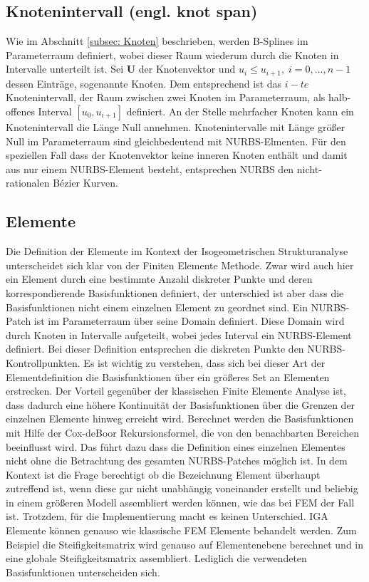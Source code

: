\documentclass[german,a4paper,12pt,oneside]{scrbook}
\theoremstyle{definition}
\theoremstyle{definition}
\theoremstyle{definition}
\theoremstyle{definition}
\theoremstyle{definition}
\theoremstyle{definition}
\begin{document}
\subsection{Knotenintervall (engl. knot span)}
\label{subsec: Knotenintervall}
Wie im Abschnitt \ref{subsec: Knoten} beschrieben, werden B-Splines im Parameterraum definiert, wobei dieser Raum wiederum durch die Knoten in Intervalle unterteilt ist. Sei $\bm{U}$ der Knotenvektor und $u_i \leq u_{i+1}, \; i = 0,...,n-1$  dessen Einträge, sogenannte Knoten. Dem entsprechend ist das $i-te$ Knotenintervall, der Raum zwischen zwei Knoten im Parameterraum, als halb-offenes Interval $[u_0, u_{i+1}]$ definiert. An der Stelle mehrfacher Knoten kann ein Knotenintervall die Länge Null annehmen. Knotenintervalle mit Länge größer Null im Parameterraum sind gleichbedeutend mit NURBS-Elmenten. Für den speziellen Fall dass der Knotenvektor keine inneren Knoten enthält und damit aus nur einem NURBS-Element besteht, entsprechen NURBS den nicht-rationalen Bézier Kurven. 

\subsection{Elemente}
Die Definition der Elemente im Kontext der Isogeometrischen Strukturanalyse unterscheidet sich klar von der Finiten Elemente Methode. Zwar wird auch hier ein Element durch eine bestimmte Anzahl diskreter Punkte und deren korrespondierende Basisfunktionen definiert, der unterschied ist aber dass die Basisfunktionen nicht einem einzelnen Element zu geordnet sind. Ein NURBS-Patch ist im Parameterraum über seine Domain definiert. Diese Domain wird durch Knoten in Intervalle aufgeteilt, wobei jedes Interval ein NURBS-Element definiert. Bei dieser Definition entsprechen die diskreten Punkte den NURBS-Kontrollpunkten. Es ist wichtig zu verstehen, dass sich bei dieser Art der Elementdefinition die Basisfunktionen über ein größeres Set an Elementen erstrecken. Der Vorteil gegenüber der klassischen Finite Elemente Analyse ist, dass dadurch eine höhere Kontinuität der Basisfunktionen über die Grenzen der einzelnen Elemente hinweg erreicht wird. 
Berechnet werden die Basisfunktionen mit Hilfe der Cox-deBoor Rekursionsformel, die von den benachbarten Bereichen beeinflusst wird. Das führt dazu dass die Definition eines einzelnen Elementes nicht ohne die Betrachtung des gesamten NURBS-Patches möglich ist. In dem Kontext ist die Frage berechtigt ob die Bezeichnung Element überhaupt zutreffend ist, wenn diese gar nicht unabhängig voneinander erstellt und beliebig in einem größeren Modell assembliert werden können, wie das bei FEM der Fall ist. Trotzdem, für die Implementierung macht es keinen Unterschied. IGA Elemente können genauso wie klassische FEM Elemente behandelt werden. Zum Beispiel die Steifigkeitsmatrix wird genauso auf Elementenebene berechnet und in eine globale Steifigkeitsmatrix assembliert. Lediglich die verwendeten Basisfunktionen unterscheiden sich. 
\end{document}
